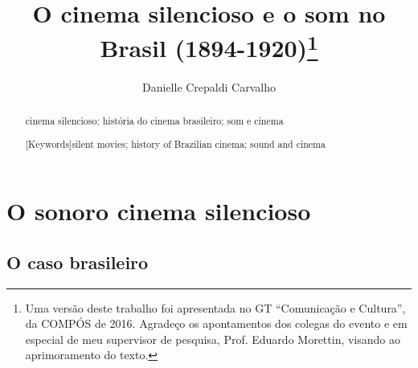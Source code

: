 \documentclass[11pt,a4paper,twoside]{galaxia}
\title{O cinema silencioso e o som no Brasil (1894-1920)\thanks{Uma versão
deste trabalho foi apresentada no GT “Comunicação e Cultura”, da COMPÓS de
2016. Agradeço os apontamentos dos colegas do evento e em especial de meu
supervisor de pesquisa, Prof. Eduardo Morettin, visando ao aprimoramento do
texto.}}
\author{Danielle Crepaldi Carvalho}
\begin{document}
\pagestyle{fancy}
\frenchspacing

\maketitle
\thispagestyle{paginaum}

\begin{abstract}{cinema silencioso; história do cinema brasileiro; som e cinema}
  \blindtext
\end{abstract}

\begin{abstract}[Keywords]{silent movies; history of Brazilian cinema; sound and cinema}
  \blindtext
\end{abstract}
\clearpage

\section{O sonoro cinema silencioso}
\Blindtext[5]

\subsection{O caso brasileiro}
\Blindtext[7]
\end{document}
